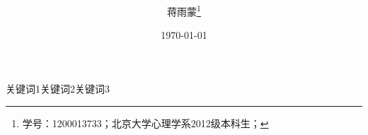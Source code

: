 \documentclass[UTF8]{ctexart}
\title{\bfseries }
\author{蒋雨蒙\thanks{学号：1200013733；北京大学心理学系2012级本科生；}}
\date{\today}
\begin{document}
\maketitle


\begin{center}
\parbox{130mm}{

\par
\vspace{1mm}
关键词1\quad 关键词2\quad 关键词3}
\end{center}



\renewcommand{\refname}{参考文献}

\end{document}
